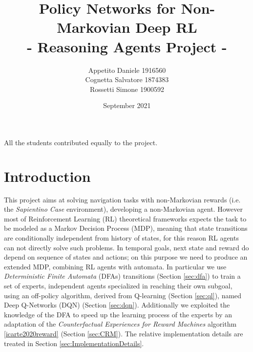 \documentclass{article}
\title{Policy Networks for Non-Markovian Deep RL\\\large - Reasoning Agents Project -}
\author{Appetito Daniele 1916560\\
        Cognetta Salvatore 1874383\\
        Rossetti Simone 1900592\\}
\date{September 2021}
\begin{document}
\maketitle

\clearpage
\thispagestyle{empty}
\vspace*{\fill}
All the students contributed equally to the project.
\vspace*{\fill}
\clearpage


\tableofcontents

\newpage

\newpage


\section{Introduction} %
This project aims at solving navigation tasks with non-Markovian rewards (i.e. the \textit{Sapientino Case} environment), developing a non-Markovian agent. However most of Reinforcement Learning (RL) theoretical frameworks expects the task to be modeled as a Markov Decision Process (MDP), meaning that state transitions are conditionally independent from history of states, for this reason RL agents can not directly solve such problems. In temporal goals, next state and reward do depend on sequence of states and actions; on this purpose we need to produce an extended MDP, combining RL agents with automata. In particular we use \textit{Deterministic Finite Automata} (DFAs) transitions (Section \ref{sec:dfa}) to train a set of experts, independent agents specialized in reaching their own subgoal, using an off-policy algorithm, derived from Q-learning (Section \ref{sec:ql}),  named Deep Q-Networks (DQN) (Section \ref{sec:dqn}). Additionally we exploited the knowledge of the DFA to speed up the learning process of the experts by an adaptation of the \textit{Counterfactual Experiences for Reward Machines} algorithm \ref{icarte2020reward} (Section \ref{sec:CRM}). The relative implementation details are treated in Section \ref{sec:ImplementationDetails}.



\end{document}
